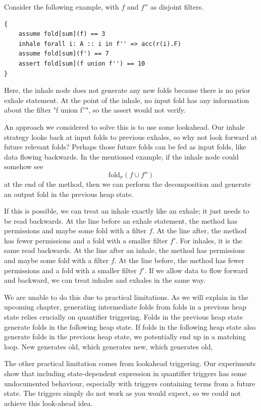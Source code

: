 \documentclass[msc,oneside]{ubcthesis}
\begin{document}
Consider the following example, with $f$ and $f''$ as disjoint filters. 
\begin{lstlisting}
{
    assume fold[sum](f) == 3
    inhale forall i: A :: i in f'' => acc(r(i).F)
    assume fold[sum](f') == 7
    assert fold[sum](f union f'') == 10
}
\end{lstlisting}

Here, the inhale node does not generate any new folds because there is no prior exhale statement. At the point of the inhale, no input fold has any information about the filter "f union f''", so the assert would not verify. 

An approach we considered to solve this is to use some lookahead. Our inhale strategy looks back at input folds to previous exhales, so why not look forward at future relevant folds? Perhaps those future folds can be fed as input folds, like data flowing backwards. In the mentioned example, if the inhale node could somehow see $$\textrm{fold}_{\sigma}(f \cup f'')$$ at the end of the method, then we can perform the decomposition and generate an output fold in the previous heap state. 

If this is possible, we can treat an inhale exactly like an exhale; it just needs to be read backwards. At the line before an exhale statement, the method has permissions and maybe some fold with a filter $f$. At the line after, the method has fewer permissions and a fold with a smaller filter $f'$. For inhales, it is the same read backwards. At the line after an inhale, the method has permissions and maybe some fold with a filter $f$. At the line before, the method has fewer permissions and a fold with a smaller filter $f'$. If we allow data to flow forward and backward, we can treat inhales and exhales in the same way.

We are unable to do this due to practical limitations. As we will explain in the upcoming chapter, generating intermediate folds from folds in a previous heap state relies crucially on quantifier triggering. Folds in the previous heap state generate folds in the following heap state. If folds in the following heap state also generate folds in the previous heap state, we potentially end up in a matching loop. New generates old, which generates new, which generates old, \etc

The other practical limitation comes from lookahead triggering. Our experiments show that including state-dependent expression in quantifier triggers has some undocumented behaviour, especially with triggers containing terms from a future state. The triggers simply do not work as you would expect, so we could not achieve this look-ahead idea.
\end{document}
